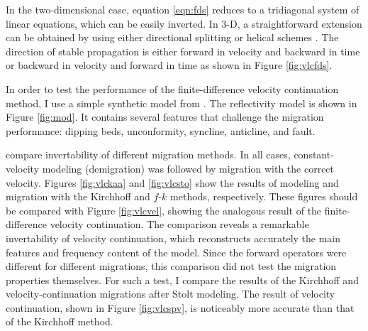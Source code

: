 
In the two-dimensional case, equation \ref{eqn:fds} reduces to a
tridiagonal system of linear equations, which can be easily inverted.
In 3-D, a straightforward extension can be obtained by using either
directional splitting or helical schemes \cite[]{SEG-1998-1124}. The
direction of stable propagation is either forward in velocity and
backward in time or backward in velocity and forward in time as shown
in Figure \ref{fig:vlcfds}.



In order to test the performance of the finite-difference velocity
continuation method, I use a simple synthetic model from
\cite{Claerbout.bei.95}. The reflectivity model is shown in
Figure \ref{fig:mod}. It contains several features that challenge the
migration performance: dipping beds, unconformity, syncline,
anticline, and fault. 


 compare invertability of different
migration methods. In all cases, constant-velocity modeling (demigration) 
was followed by migration with the correct velocity.  Figures
\ref{fig:vlckaa} and \ref{fig:vlcsto} show the results of modeling and
migration with the Kirchhoff \cite[]{GEO43-01-00490076} and $f$-$k$
\cite[]{GEO43-01-00230048} methods, respectively. These figures should
be compared with Figure \ref{fig:vlcvel}, showing the analogous result
of the finite-difference velocity continuation.  The comparison
reveals a remarkable invertability of velocity continuation, which
reconstructs accurately the main features and frequency content of the
model. Since the forward operators were different for different
migrations, this comparison did not test the migration properties
themselves. For such a test, I compare the results of the Kirchhoff
and velocity-continuation migrations after Stolt modeling.  The result
of velocity continuation, shown in Figure \ref{fig:vlcspv}, is
noticeably more accurate than that of the Kirchhoff method.

